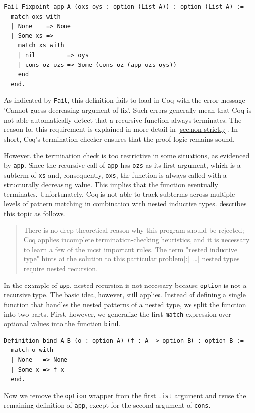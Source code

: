 \documentclass[a4paper, 11pt, fleqn, twoside, abstract=on]{scrreprt}
\newcommand{\cinl}[1]{\texttt{#1}}
\begin{document}
\begin{verbatim}
Fail Fixpoint app A (oxs oys : option (List A)) : option (List A) :=
  match oxs with
  | None    => None
  | Some xs =>
    match xs with
    | nil         => oys
    | cons oz ozs => Some (cons oz (app ozs oys))
    end
  end.
\end{verbatim}
\noindent
As indicated by \cinl{Fail}, this definition fails to load in Coq with the error message 'Cannot guess decreasing argument of fix'.
Such errors generally mean that Coq is not able automatically detect that a recursive function always terminates.
The reason for this requirement is explained in more detail in \autoref{sec:non-strictly}.
In short, Coq's termination checker ensures that the proof logic remains sound.

However, the termination check is too restrictive in some situations, as evidenced by \cinl{app}.
Since the recursive call of \cinl{app} has \cinl{ozs} as its first argument, which is a subterm of \cinl{xs} and, consequently, \cinl{oxs}, the function is always called with a structurally decreasing value.
This implies that the function eventually terminates.
Unfortunately, Coq is not able to track subterms across multiple levels of pattern matching in combination with nested inductive types. \citet{chlipala2013certified} describes this topic as follows.

\begin{quotation}
\noindent
There is no deep theoretical reason why this program should be rejected; Coq applies incomplete termination-checking heuristics, and it is necessary to learn a few of the most important rules.
The term "nested inductive type" hints at the solution to this particular problem[:] [\dots{}] nested types require nested recursion.
\end{quotation}
\noindent
In the example of \cinl{app}, nested recursion is not necessary because \cinl{option} is not a recursive type.
The basic idea, however, still applies.
Instead of defining a single function that handles the nested patterns of a nested type, we split the function into two parts.
First, however, we generalize the first \cinl{match} expression over optional values into the function \cinl{bind}.

\begin{verbatim}
Definition bind A B (o : option A) (f : A -> option B) : option B :=
  match o with
  | None   => None
  | Some x => f x
  end.
\end{verbatim}

Now we remove the \cinl{option} wrapper from the first \cinl{List} argument and reuse the remaining definition of \cinl{app}, except for the second argument of \cinl{cons}.
\end{document}
